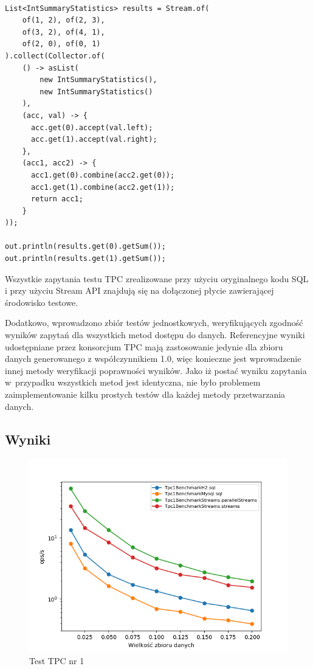 \documentclass[12pt,twoside,openright]{extarticle}
\begin{document}
\begin{lstlisting}[label=streamsaggregations, caption=Przykładowa implementacja funkcji agregującej operującej na dwóch polach]

List<IntSummaryStatistics> results = Stream.of(
    of(1, 2), of(2, 3),
    of(3, 2), of(4, 1),
    of(2, 0), of(0, 1)
).collect(Collector.of(
    () -> asList(
        new IntSummaryStatistics(),
        new IntSummaryStatistics()
    ),
    (acc, val) -> {
      acc.get(0).accept(val.left);
      acc.get(1).accept(val.right);
    },
    (acc1, acc2) -> {
      acc1.get(0).combine(acc2.get(0));
      acc1.get(1).combine(acc2.get(1));
      return acc1;
    }
));

out.println(results.get(0).getSum());
out.println(results.get(1).getSum());

\end{lstlisting}

    Wszystkie zapytania testu TPC zrealizowane przy użyciu oryginalnego kodu SQL i przy użyciu Stream API znajdują się na dołączonej płycie zawierającej środowisko testowe.

    Dodatkowo, wprowadzono zbiór testów jednostkowych, weryfikujących zgodność wyników zapytań dla wszystkich metod dostępu do danych. Referencyjne wyniki \cite{tpcresults} udostępniane przez konsorcjum TPC mają zastosowanie jedynie dla zbioru danych generowanego z współczynnikiem 1.0, więc konieczne jest wprowadzenie innej metody weryfikacji poprawności wyników. Jako iż postać wyniku zapytania w~przypadku wszystkich metod jest identyczna, nie było problemem zaimplementowanie kilku prostych testów dla każdej metody przetwarzania danych.


\newpage
\subsection{Wyniki} \label{tpcgraphs}

\begin{figure}[h]
\centering
\includegraphics[width=15cm]{plots/Tpc1Benchmark}
\caption{Test TPC nr 1}
    \label{fig:tpc1}
\end{figure}
\end{document}
